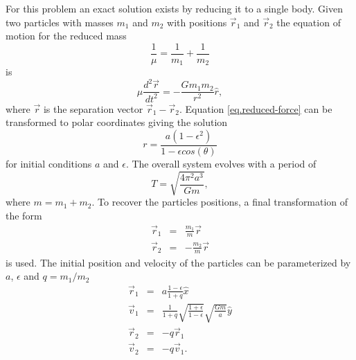 For this problem an exact solution exists by reducing it to a single body. Given
two particles with masses $m_1$ and $m_2$ with positions $\vec{r}_1$ and $\vec{r}_2$ the equation of motion for
the reduced mass
\begin{equation}
	\frac{1}{\mu} = \frac{1}{m_1} + \frac{1}{m_2}
\end{equation}
is
\begin{equation}
	\mu\frac{d^2 \vec{r}}{dt^2} = -\frac{G m_1 m_2}{r^2}\hat{r},
    \label{eq.reduced-force}
\end{equation}
where $\vec{r}$ is the separation vector $\vec{r}_1 - \vec{r}_2$. Equation \ref{eq.reduced-force} can be
transformed to polar coordinates giving the solution
\begin{equation}
	r = \frac{a(1-\epsilon^2)}{1-\epsilon cos(\theta)}
\end{equation}
for initial conditions $a$ and $\epsilon$. The overall system evolves with a period of
\begin{equation}
    T = \sqrt{\frac{4\pi^2 a^3}{G m}},
\end{equation}
where $m=m_1 + m_2$. To recover the particles positions, a final transformation
of the form
\begin{equation}
	\begin{array}{rcl}
		\vec{r}_1 & = & \frac{m_1}{m}\vec{r}\\
    	\vec{r}_2 & = & -\frac{m_2}{m}\vec{r}
    \end{array}
\end{equation}
is used. The initial position and velocity of the particles can be parameterized by $a$,
$\epsilon$ and $q=m_1/m_2$
\begin{equation}
	\begin{array}{rcl}
    	\vec{r}_1 & = & a\frac{1-\epsilon}{1+q} \hat{x}\\
        \vec{v}_1 & = & \frac{1}{1+q}\sqrt{\frac{1+\epsilon}{1-\epsilon}}\sqrt{\frac{Gm}{a}} \hat{y}\\
        \vec{r}_2 & = & -q \vec{r}_1\\
        \vec{v}_2 & = & -q \vec{v}_1.
    \end{array}
\end{equation}

